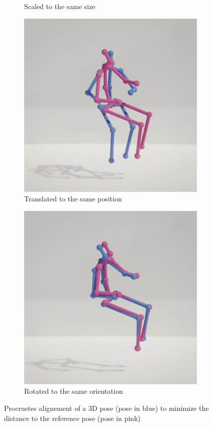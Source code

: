 \begin{figure}
\begin{subfigure}[b]{0.25\textwidth}
        \caption{Scaled to the same size}
    \end{subfigure}
    \hfill
    \begin{subfigure}[b]{0.25\textwidth}
        \centering
        \includegraphics[width=\textwidth]{figures/h36_viz/proc_pos.png}
        \caption{Translated to the same position}
    \end{subfigure}
    \hfill
    \begin{subfigure}[b]{0.25\textwidth}
        \centering
        \includegraphics[width=\textwidth]{figures/h36_viz/proc_rot.png}
        \caption{Rotated to the same orientation}
    \end{subfigure}
    \caption{Procrustes alignement of a 3D pose (pose in blue) to minimize the distance to the reference pose (pose in pink)}
    \label{fig:procrustes}
\end{figure}
